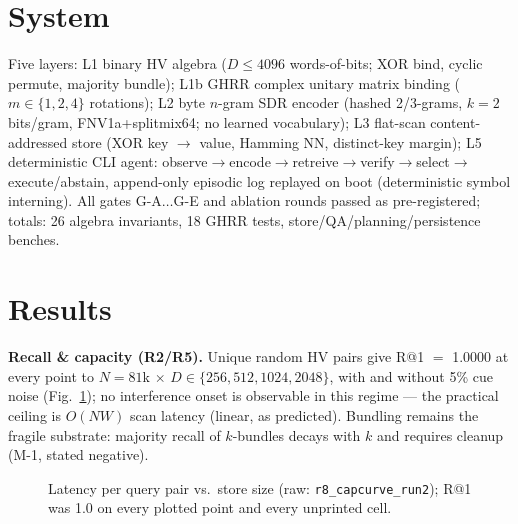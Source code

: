 \documentclass[10pt,twocolumn]{article}
\begin{document}
\section{System}
Five layers: L1 binary HV algebra ($D{\le}4096$ words-of-bits; XOR bind, cyclic permute, majority bundle); L1b GHRR complex unitary matrix binding ($m{\in}\{1,2,4\}$ rotations); L2 byte $n$-gram SDR encoder (hashed 2/3-grams, $k{=}2$ bits/gram, FNV1a+splitmix64; no learned vocabulary); L3 flat-scan content-addressed store (XOR key $\to$ value, Hamming NN, distinct-key margin); L5 deterministic CLI agent: observe$\to$encode$\to$retreive$\to$verify$\to$select$\to$execute/abstain, append-only episodic log replayed on boot (deterministic symbol interning). All gates G-A$\dots$G-E and ablation rounds passed as pre-registered; totals: 26 algebra invariants, 18 GHRR tests, store/QA/planning/persistence benches.

\section{Results}
\textbf{Recall \& capacity (R2/R5).} Unique random HV pairs give R@1 $=$ 1.0000 at every point to $N{=}81$k $\times$ $D{\in}\{256,512,1024,2048\}$, with and without 5\% cue noise (Fig.~\ref{fig:lat}); no interference onset is observable in this regime --- the practical ceiling is $O(NW)$ scan latency (linear, as predicted). Bundling remains the fragile substrate: majority recall of $k$-bundles decays with $k$ and requires cleanup (M-1, stated negative).

\begin{figure}[t]\centering
{}
\caption{Latency per query pair vs.\ store size (raw: \texttt{r8\_capcurve\_run2}); R@1 was 1.0 on every plotted point and every unprinted cell.}\label{fig:lat}
\end{figure}
\end{document}
